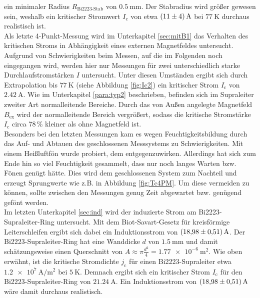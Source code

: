 \noindent
ein minimaler Radius $R_{\text{Bi2223-Stab}}$ von $\SI{0.5}{\milli\meter}$.
Der Stabradius wird größer gewesen sein, weshalb ein kritischer Stromwert
$I_{\text{c}}$ von etwa $\SI{11\pm4}{\ampere}$ bei $\SI{77}{\kelvin}$ durchaus
realistisch ist.\\
Als letzte 4-Punkt-Messung wird im Unterkapitel \ref{sec:mitB1} das Verhalten des
kritischen Stroms in Abhängigkeit eines externen Magnetfeldes untersucht.
Aufgrund von Schwierigkeiten beim Messen, auf die im Folgenden noch eingegangen wird,
werden hier nur Messungen für zwei unterschiedlich starke Durchlaufstromstärken $I$
untersucht. Unter diesen Umständen ergibt sich durch Extrapolation bis $\SI{77}{\kelvin}$
(siehe Abbildung \ref{fig:Ic2}) ein kritischer Strom $I_{\text{c}}$ von $\SI{2,42}{\ampere}$.
Wie im Unterkapitel \ref{para:typ2} beschrieben, befinden sich im Supraleiter zweiter Art
normalleitende Bereiche. Durch das von Außen angelegte Magnetfeld $B_{\text{ex}}$
wird der normalleitende Bereich vergrößert, sodass die kritische Stromstärke
$I_{\text{c}}$ circa 78$\,$\% kleiner als ohne Magnetfeld ist.\\
Besonders bei den letzten Messungen kam es wegen Feuchtigkeitsbildung durch das
Auf- und Abtauen des geschlossenen Messsystems zu Schwierigkeiten. Mit einem Heißluftfön
wurde probiert, dem entgegenzuwirken. Allerdings hat sich zum Ende hin so viel
Feuchtigkeit gesammelt, dass nur noch langes Warten bzw. Fönen genügt hätte. Dies
wird dem geschlossenen System zum Nachteil und erzeugt Sprungwerte wie z.B. in
Abbildung \ref{fig:Tc4PM}. Um diese vermeiden zu können, sollte zwischen den
Messungen genug Zeit abgewartet bzw. genügend gefönt werden.\\
Im letzten Unterkapitel \ref{sec:ind} wird der induzierte Strom am Bi2223-Supraleiter-Ring
untersucht. Mit dem Biot-Savart-Gesetz für kreisförmige Leiterschleifen ergibt
sich dabei ein Induktionsstrom von $\SI{18,98\pm0.51}{\ampere}$. Der Bi2223-Supraleiter-Ring
hat eine Wanddicke $d$ von $\SI{1,5}{\milli\meter}$ und damit schätzungsweise einen
Querschnitt von $A \approx \pi \frac{d^2}{4} = \SI{1,77e-6}{\meter\squared}$.
Wie oben erwähnt, ist die kritische Stromdichte $j_{\text{c}}$ für einen Bi2223-Supraleiter
etwa $\SI{1.2e7}{\ampere\per\metre\squared}$ bei $\SI{5}{\kelvin}$. Demnach
ergibt sich ein kritischer Strom $I_{\text{c}}$ für den Bi2223-Supraleiter-Ring
von $\SI{21,24}{\ampere}$. Ein Induktionsstrom von $\SI{18,98\pm0,51}{\ampere}$
wäre damit durchaus realistisch.
